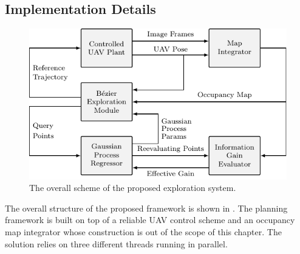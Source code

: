 \subsection{Implementation Details}%
\label{SEC:EXPLORATION-IMPLEMENTATION-DETAILS}
\begin{figure}[!t]
	\centering
	\includegraphics[scale=.9]{Figs/Chapter4/alg_scheme.pdf}
	\caption{The overall scheme of the proposed exploration system.}%
	\label{FIG:EXPLORATION-ALG-SCHEME}
\end{figure}
The overall structure of the proposed framework is shown in . The planning framework is built on top
of a reliable UAV control scheme and an occupancy map integrator whose construction is out of the scope of this chapter.
The solution relies on three different threads running in parallel.

